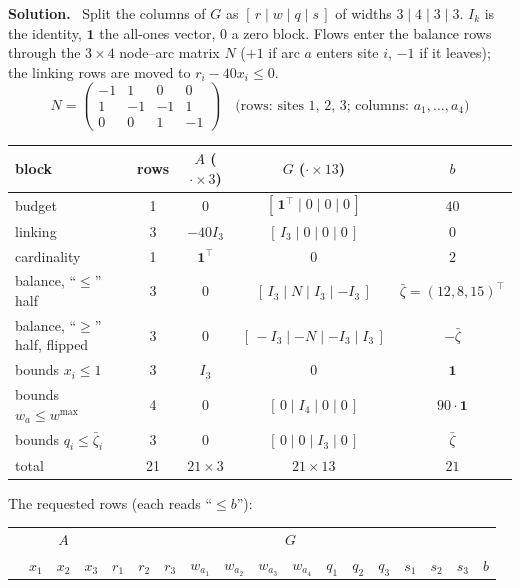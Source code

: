 \documentclass[10pt]{article}
\newenvironment{solution}
  {\par\smallskip\begingroup\color{solink}\textbf{Solution.}\ }
  {\endgroup\par}
\begin{document}
\begin{parts}
\begin{solution}
Split the columns of $G$ as $[\,r \mid w \mid q \mid s\,]$ of widths $3 \mid 4 \mid 3 \mid 3$.
$I_k$ is the identity, $\mathbf 1$ the all-ones vector, $0$ a zero block. Flows enter
the balance rows through the $3 \times 4$ node--arc matrix $N$ ($+1$ if arc $a$ enters
site $i$, $-1$ if it leaves); the linking rows are moved to $r_i - 40x_i \le 0$.
\[
N = \begin{pmatrix} -1 & 1 & 0 & 0 \\ 1 & -1 & -1 & 1 \\ 0 & 0 & 1 & -1 \end{pmatrix}
\quad \text{(rows: sites 1, 2, 3; columns: } a_1, \dots, a_4\text{)}
\]
\begin{center}
\begin{tabular}{l|c|c|c|c}
 block & rows & $A$ ($\cdot \times 3$) & $G$ ($\cdot \times 13$) & $b$ \\ \hline
 budget & 1 & $0$ & $[\,\mathbf 1^\top \mid 0 \mid 0 \mid 0\,]$ & $40$ \\
 linking & 3 & $-40 I_3$ & $[\,I_3 \mid 0 \mid 0 \mid 0\,]$ & $0$ \\
 cardinality & 1 & $\mathbf 1^\top$ & $0$ & $2$ \\
 balance, ``$\le$'' half & 3 & $0$ & $[\,I_3 \mid N \mid I_3 \mid -I_3\,]$ & $\bar\zeta = (12, 8, 15)^\top$ \\
 balance, ``$\ge$'' half, flipped & 3 & $0$ & $[\,-I_3 \mid -N \mid -I_3 \mid I_3\,]$ & $-\bar\zeta$ \\
 bounds $x_i \le 1$ & 3 & $I_3$ & $0$ & $\mathbf 1$ \\
 bounds $w_a \le w^{\max}$ & 4 & $0$ & $[\,0 \mid I_4 \mid 0 \mid 0\,]$ & $90 \cdot \mathbf 1$ \\
 bounds $q_i \le \bar\zeta_i$ & 3 & $0$ & $[\,0 \mid 0 \mid I_3 \mid 0\,]$ & $\bar\zeta$ \\ \hline
 total & 21 & $21 \times 3$ & $21 \times 13$ & $21$
\end{tabular}
\end{center}
The requested rows (each reads ``$\le b$''):
\begin{center}
\setlength{\tabcolsep}{3.2pt}\small
\begin{tabular}{l|ccc|ccc|cccc|ccc|ccc|c}
 & \multicolumn{3}{c|}{$A$} & \multicolumn{13}{c|}{$G$} & \\
 & $x_1$ & $x_2$ & $x_3$ & $r_1$ & $r_2$ & $r_3$ & $w_{a_1}$ & $w_{a_2}$ & $w_{a_3}$ & $w_{a_4}$ & $q_1$ & $q_2$ & $q_3$ & $s_1$ & $s_2$ & $s_3$ & $b$ \\ \hline

\end{tabular}
\end{center}
\end{solution}
\end{parts}
\end{document}
